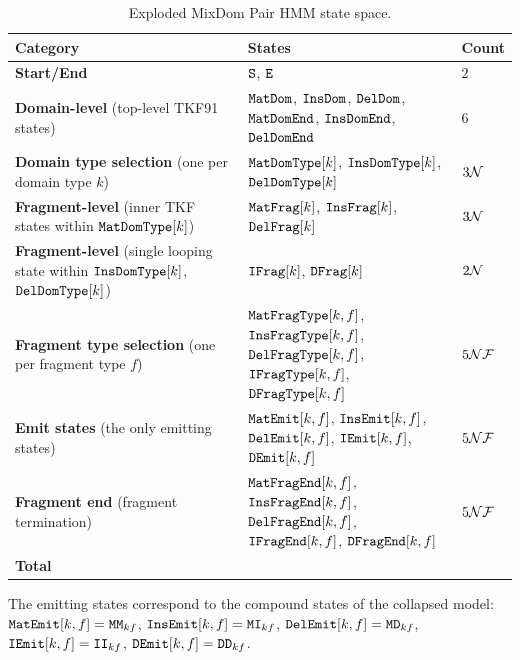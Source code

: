\begin{table}[t]
\centering
\caption{Exploded MixDom Pair HMM state space.}
\label{tab:exploded-state-space}
\begin{tabular}{>{\raggedright\arraybackslash}p{0.50\linewidth} >{\raggedright\arraybackslash}p{0.45\linewidth} >{\raggedleft\arraybackslash}p{0.05\linewidth}}
\hline
\textbf{Category} & \textbf{States} & \textbf{Count} \\
\hline
\textbf{Start/End}
& ${\tt S}$, ${\tt E}$ & $2$ \\

\textbf{Domain-level} (top-level TKF91 states)
& $\mathtt{MatDom}$, $\mathtt{InsDom}$, $\mathtt{DelDom}$, $\mathtt{MatDomEnd}$, $\mathtt{InsDomEnd}$, $\mathtt{DelDomEnd}$ & $6$ \\

\textbf{Domain type selection} (one per domain type $k$)
& $\mathtt{MatDomType}[k]$, $\mathtt{InsDomType}[k]$, $\mathtt{DelDomType}[k]$ & $3\mathcal{N}$ \\

\textbf{Fragment-level} (inner TKF states within $\mathtt{MatDomType}[k]$)
& $\mathtt{MatFrag}[k]$, $\mathtt{InsFrag}[k]$, $\mathtt{DelFrag}[k]$ & $3\mathcal{N}$ \\

\textbf{Fragment-level} (single looping state within $\mathtt{InsDomType}[k]$, $\mathtt{DelDomType}[k]$)
& $\mathtt{IFrag}[k]$, $\mathtt{DFrag}[k]$ & $2\mathcal{N}$ \\

\textbf{Fragment type selection} (one per fragment type $f$)
& $\mathtt{MatFragType}[k,f]$, $\mathtt{InsFragType}[k,f]$, $\mathtt{DelFragType}[k,f]$,
  $\mathtt{IFragType}[k,f]$, $\mathtt{DFragType}[k,f]$ & $5\mathcal{N}\mathcal{F}$ \\

\textbf{Emit states} (the only emitting states)
& $\mathtt{MatEmit}[k,f]$, $\mathtt{InsEmit}[k,f]$, $\mathtt{DelEmit}[k,f]$,
  $\mathtt{IEmit}[k,f]$, $\mathtt{DEmit}[k,f]$ & $5\mathcal{N}\mathcal{F}$ \\

\textbf{Fragment end} (fragment termination)
& $\mathtt{MatFragEnd}[k,f]$, $\mathtt{InsFragEnd}[k,f]$, $\mathtt{DelFragEnd}[k,f]$,
  $\mathtt{IFragEnd}[k,f]$, $\mathtt{DFragEnd}[k,f]$ & $5\mathcal{N}\mathcal{F}$ \\
\hline
\textbf{Total} & \multicolumn{2}{r}{$8 + 8\ndom + 15\ndom\nfrag$} \\
\hline
\end{tabular}
\end{table}

The emitting states correspond to the compound states of the collapsed model:
$\mathtt{MatEmit}[k,f] = \mathtt{MM}_{kf}$, $\mathtt{InsEmit}[k,f] = \mathtt{MI}_{kf}$,
$\mathtt{DelEmit}[k,f] = \mathtt{MD}_{kf}$, $\mathtt{IEmit}[k,f] = \mathtt{II}_{kf}$,
$\mathtt{DEmit}[k,f] = \mathtt{DD}_{kf}$.


